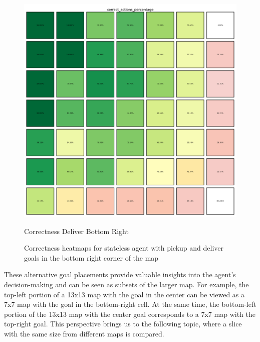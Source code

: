 \begin{figure}[h]
\begin{minipage}[b]{0.45\textwidth}
    \includegraphics[width=\textwidth]{
      images/results_discussion/stateless/not_central/chm_deliver_bottom_right.png
    }
    \caption{Correctness Deliver Bottom Right}
    \label{fig:chm_deliver_bottom_right}
  \end{minipage}
  \caption{Correctness heatmaps for stateless agent with pickup and deliver
  goals in the bottom right corner of the map}
  \label{fig:stateless_bottom_right_correctness}
\end{figure}
\vspace{5mm}

These alternative goal placements provide valuable insights into the agent's
decision-making and can be seen as subsets of the larger map. For example, the
top-left portion of a 13x13 map with the goal in the center can be viewed as a
7x7 map with the goal in the bottom-right cell. At the same time, the bottom-left
portion of the 13x13 map with the center goal corresponds to a 7x7 map with the
top-right goal. This perspective brings us to the following topic, where a slice
with the same size from different maps is compared.

